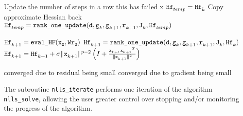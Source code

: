\begin{algorithm}
  \ContinuedFloat
  \begin{algorithmic}
    
          \Comment Update the number of steps in a row this has failed
            x
            \State ${\iter[temp]{\thess}} = {\iter[k]{\thess}}$
            \Comment Copy approximate Hessian back
          \EndIf
          \EndIf
        \EndIf
      \State ${\iter[temp]{\thess}} = \Call{{\tt rank\_one\_update}}{\td ,\iter[k]{\tg},\iter[k+1]{\tg}, \iter[k+1]{\tr},\iter[k]{\tJ},\iter[temp]{\thess}}$
      \EndIf
    \EndIf

        \State $\iter[k+1]{\thess} = {\tt \text{\tt eval\_HF}(\iter[0]{\tx},W\iter[0]{\tr})}$
      \Else
        \State ${\iter[k+1]{\thess}} = \Call{{\tt rank\_one\_update}}{\td ,\iter[k]{\tg},\iter[k+1]{\tg}, \iter[k+1]{\tr},\iter[k]{\tJ},\iter[k]{\thess}}$
      \EndIf
    \EndIf
    \State $\iter[k+1]{\thess}  = \iter[k+1]{\thess}  + \sigma \|\iter[k+1]{\tx}\|^{p-2}
    \left(I + \frac{{\iter[k+1]{\tx}}{\iter[k+1]{\tx}}^T}{\|\iter[k+1]{\tx}\|^2}\right)$
    \EndIf

    \Comment converged due to residual being small
    \Comment converged due to gradient being small
    \EndIf
    \EndFor
  \end{algorithmic}
\end{algorithm}

The subroutine \texttt{nlls\_iterate} performs one iteration of the algorithm
\texttt{nlls\_solve}, allowing the user greater control over stopping and/or monitoring the progress of the algorithm.

